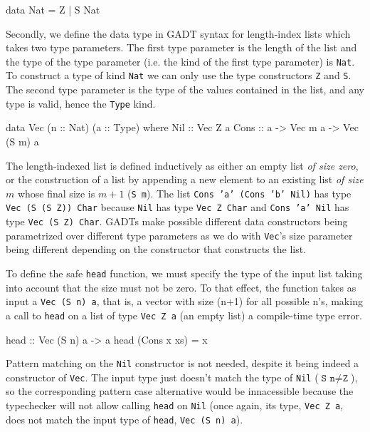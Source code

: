 \documentclass[]{lwnovathesis}
\begin{document}
\begin{code}
    data Nat = Z | S Nat
  \end{code}


Secondly, we define the data type in GADT syntax for length-index lists which
takes two type parameters. The first type parameter is the length of the list
and the type of the type parameter (i.e. the kind of the first type parameter)
is \texttt{Nat}. To construct a type of kind \texttt{Nat} we can only use the
type constructors \texttt{Z} and \texttt{S}. The second type parameter is the
type of the values contained in the list, and any type is valid, hence the
\texttt{Type} kind.

\begin{code}
    data Vec (n :: Nat) (a :: Type) where
        Nil :: Vec Z a
        Cons :: a -> Vec m a -> Vec (S m) a
\end{code}

The length-indexed list is defined inductively as either an empty list \emph{of
size zero}, or the construction of a list by appending a new element to an
existing list \emph{of size $m$} whose final size is $m+1$ (\texttt{S m}). The
list \texttt{Cons~'a'~(Cons~'b'~Nil)} has type \texttt{Vec~(S~(S~Z))~Char}
because \texttt{Nil} has type \texttt{Vec~Z~Char} and \texttt{Cons~'a'~Nil} has
type \texttt{Vec~(S~Z)~Char}.
GADTs make possible different data constructors being parametrized over
different type parameters as we do with \texttt{Vec}'s size parameter being
different depending on the constructor that constructs the list.

To define the safe \texttt{head} function, we must specify the type of the input
list taking into account that the size must not be zero. To that effect, the
function takes as input a \texttt{Vec (S n) a}, that is, a vector with size
(n+1) for all possible n's, making a call to \texttt{head} on a list of type
\texttt{Vec Z a} (an empty list) a compile-time type error.

\begin{code}
    head :: Vec (S n) a -> a
    head (Cons x xs) = x
\end{code}

Pattern matching on the \texttt{Nil} constructor is not needed, despite it being
indeed a constructor of \texttt{Vec}. The input type just doesn't match the type
of \texttt{Nil} ($\texttt{S~n} \neq \texttt{Z}$), so the corresponding pattern
case alternative would be innacessible because the typechecker will not allow
calling \texttt{head} on \texttt{Nil} (once again, its type, \texttt{Vec~Z~a},
does not match the input type of \texttt{head}, \texttt{Vec~(S~n)~a}).
\end{document}
